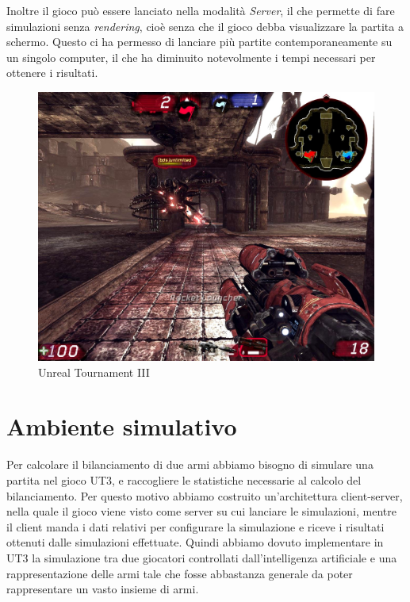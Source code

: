 \documentclass[12pt, italian]{toptesi}
\begin{document}
Inoltre il gioco può essere lanciato nella modalità \emph{Server}, il che permette di fare simulazioni senza \emph{rendering}, cioè senza che il gioco debba visualizzare la partita a schermo. Questo ci ha permesso di lanciare più partite contemporaneamente su un singolo computer, il che ha diminuito notevolmente i tempi necessari per ottenere i risultati.

\begin{figure}
\centering
\includegraphics[width=1.0\textwidth]{UT3}
\caption{Unreal Tournament III}
\label{fig:ut3}
\end{figure}

\section{Ambiente simulativo}
\label{sec:setting}
Per calcolare il bilanciamento di due armi abbiamo bisogno di simulare una partita nel gioco UT3, e raccogliere le statistiche necessarie al calcolo del bilanciamento.
Per questo motivo abbiamo costruito un'architettura client-server, nella quale il gioco viene visto come server su cui lanciare le simulazioni, mentre il client manda i dati relativi per configurare la simulazione e riceve i risultati ottenuti dalle simulazioni effettuate.
Quindi abbiamo dovuto implementare in UT3 la simulazione tra due giocatori controllati dall'intelligenza artificiale e una rappresentazione delle armi tale che fosse abbastanza generale da poter rappresentare un vasto insieme di armi.
\end{document}
